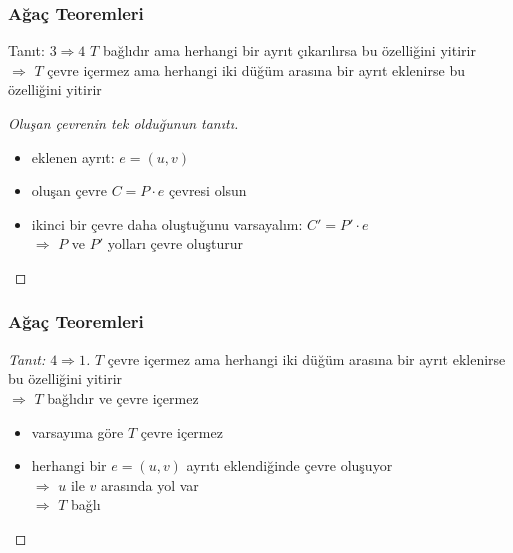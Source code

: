 \documentclass[dvipsnames]{beamer}
\theoremstyle{definition}
\theoremstyle{example}
\theoremstyle{plain}
\begin{document}
\begin{frame}
  \frametitle{Ağaç Teoremleri}

  \begin{block}{Tanıt: $3 \Rightarrow 4$}
    $T$ bağlıdır ama herhangi bir ayrıt çıkarılırsa bu özelliğini yitirir\\
    $\Rightarrow$ $T$ çevre içermez ama herhangi iki düğüm arasına bir ayrıt
    eklenirse bu özelliğini yitirir
  \end{block}

  \pause
  \begin{proof}[Oluşan çevrenin tek olduğunun tanıtı]
    \begin{itemize}
      \item eklenen ayrıt: $e = (u,v)$

      \pause
      \item oluşan çevre $C = P \cdot e$ çevresi olsun

      \pause
      \item ikinci bir çevre daha oluştuğunu varsayalım:
        $C' = P' \cdot e$\\
        \pause
        $\Rightarrow$ $P$ ve $P'$ yolları çevre oluşturur
    \end{itemize}
  \end{proof}
\end{frame}

\begin{frame}
  \frametitle{Ağaç Teoremleri}

  \begin{proof}[Tanıt: $4 \Rightarrow 1$]
    $T$ çevre içermez ama herhangi iki düğüm arasına bir ayrıt eklenirse bu
    özelliğini yitirir\\
    $\Rightarrow$ $T$ bağlıdır ve çevre içermez

    \pause
    \begin{itemize}
      \item varsayıma göre $T$ çevre içermez

      \pause
      \item herhangi bir $e = (u,v)$ ayrıtı eklendiğinde çevre oluşuyor\\
        $\Rightarrow$ $u$ ile $v$ arasında yol var\\
        $\Rightarrow$ $T$ bağlı
    \end{itemize}
  \end{proof}
\end{frame}
\end{document}
